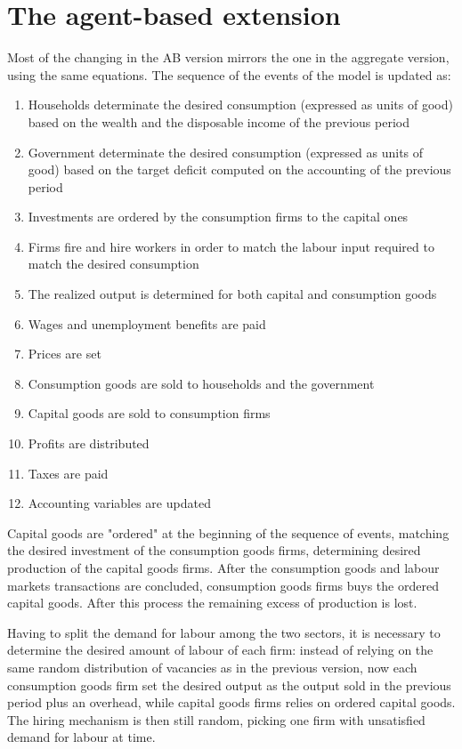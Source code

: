 \section{The agent-based extension}
Most of the changing in the AB version mirrors the one in the aggregate version, using the same equations.
The sequence of the events of the model is updated as:
\begin{enumerate}[label=\textbf{\Alph*}]
    \item Households determinate the desired consumption (expressed as units of good) based on the wealth and the disposable income of the previous period
    \item Government determinate the desired consumption (expressed as units of good) based on the target deficit computed on the accounting of the previous period
    \item Investments are ordered by the consumption firms to the capital ones
    \item Firms fire and hire workers in order to match the labour input required to match the desired consumption
    \item The realized output is determined for both capital and consumption goods
    \item Wages and unemployment benefits are paid
    \item Prices are set
    \item Consumption goods are sold to households and the government
    \item Capital goods are sold to consumption firms
    \item Profits are distributed
    \item Taxes are paid
    \item Accounting variables are updated
\end{enumerate}

Capital goods are "ordered" at the beginning of the sequence of events, matching the desired investment of the consumption goods firms, determining desired production of the capital goods firms.
After the consumption goods and labour markets transactions are concluded, consumption goods firms buys the ordered capital goods.
After this process the remaining excess of production is lost.

Having to split the demand for labour among the two sectors, it is necessary to determine the desired amount of labour of each firm: instead of relying on the same random distribution of vacancies as in the previous version, now each consumption goods firm set the desired output as the output sold in the previous period plus an overhead, while capital goods firms relies on ordered capital goods.
The hiring mechanism is then still random, picking one firm with unsatisfied demand for labour at time.

